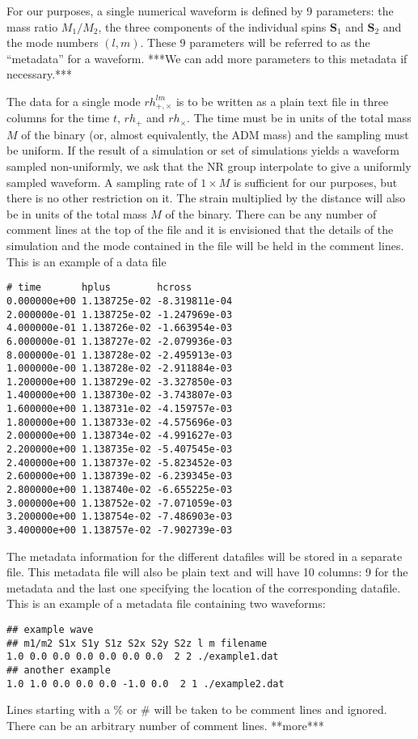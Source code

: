 \documentclass[amsmath,amssymb]{article}
\begin{document}
For our purposes, a single numerical waveform is defined by 9
parameters: the mass ratio $M_1/M_2$, the three components of the
individual spins $\mathbf{S}_1$ and $\mathbf{S}_2$ and the mode
numbers $(l,m)$.  These 9 parameters will be referred to as the
``metadata'' for a waveform.  ***We can add more parameters to this
metadata if necessary.***

The data for a single mode $rh_{+,\times}^{lm}$ is to be written as a
plain text file in three columns for the time $t$, $rh_+$ and
$rh_\times$.  The time must be in units of the total mass $M$ of the
binary (or, almost equivalently, the ADM mass) and the sampling must be
uniform.  If the result of a simulation or set of simulations yields a
waveform sampled non-uniformly, we ask that the NR group interpolate to
give a uniformly sampled waveform.  A sampling rate of $1\times M$ is
sufficient for our purposes, but there is no other restriction on it.
The strain multiplied by the distance will also be in units of the total
mass $M$ of the binary.  There can be any number of comment lines at the
top of the file and it is envisioned that the details of the simulation
and the mode contained in the file will be held in the comment lines.
This is an example of a data file 

\begin{verbatim}
# time       hplus        hcross
0.000000e+00 1.138725e-02 -8.319811e-04
2.000000e-01 1.138725e-02 -1.247969e-03
4.000000e-01 1.138726e-02 -1.663954e-03
6.000000e-01 1.138727e-02 -2.079936e-03
8.000000e-01 1.138728e-02 -2.495913e-03
1.000000e-00 1.138728e-02 -2.911884e-03
1.200000e+00 1.138729e-02 -3.327850e-03
1.400000e+00 1.138730e-02 -3.743807e-03
1.600000e+00 1.138731e-02 -4.159757e-03
1.800000e+00 1.138733e-02 -4.575696e-03
2.000000e+00 1.138734e-02 -4.991627e-03
2.200000e+00 1.138735e-02 -5.407545e-03
2.400000e+00 1.138737e-02 -5.823452e-03
2.600000e+00 1.138739e-02 -6.239345e-03
2.800000e+00 1.138740e-02 -6.655225e-03
3.000000e+00 1.138752e-02 -7.071059e-03
3.200000e+00 1.138754e-02 -7.486903e-03
3.400000e+00 1.138757e-02 -7.902739e-03
\end{verbatim}

The metadata information for the different datafiles will be stored in
a separate file.  This metadata file will also be plain text and
will have 10 columns: 9 for the metadata and the last one specifying
the location of the corresponding datafile.  This is an example of a
metadata file containing two waveforms:
\begin{verbatim}
## example wave
## m1/m2 S1x S1y S1z S2x S2y S2z l m filename
1.0 0.0 0.0 0.0 0.0 0.0 0.0  2 2 ./example1.dat
## another example
1.0 1.0 0.0 0.0 0.0 -1.0 0.0  2 1 ./example2.dat
\end{verbatim}
Lines starting with a $\%$ or $\#$ will be taken to be comment lines and
ignored. There can be an arbitrary number of comment lines.  **more***
\end{document}

